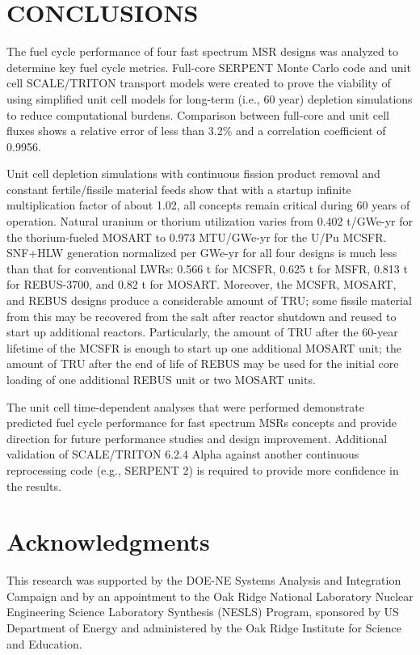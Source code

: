 \documentclass{anstrans}
\begin{document}
\section{CONCLUSIONS}
The fuel cycle performance of four fast spectrum \gls{MSR} designs was analyzed to determine key fuel cycle metrics. Full-core SERPENT Monte Carlo code and unit cell SCALE/TRITON transport models were created to prove the viability of using simplified unit cell models for long-term (i.e., 60 year) depletion simulations to reduce computational burdens. Comparison between full-core and unit cell fluxes shows a relative error of less than 3.2\% and a correlation coefficient of 0.9956.

Unit cell depletion simulations with continuous fission product removal and constant fertile/fissile material feeds show that with a startup infinite multiplication factor of about 1.02, all concepts remain critical during 60 years of operation. Natural uranium or thorium utilization varies from 0.402 t/GWe-yr for the thorium-fueled \gls{MOSART} to 0.973 MTU/GWe-yr for the U/Pu \gls{MCSFR}. \gls{SNF}+\gls{HLW} generation normalized per GWe-yr for all four designs is much less than that for conventional \glspl{LWR}: 0.566 t for \gls{MCSFR}, 0.625 t for \gls{MSFR}, 0.813 t for REBUS-3700, and 0.82 t for \gls{MOSART}. Moreover, the \gls{MCSFR}, \gls{MOSART}, and REBUS designs produce a considerable amount of \gls{TRU}; some fissile material from this may be recovered from the salt after reactor shutdown and reused to start up additional reactors. Particularly, the amount of \gls{TRU} after the 60-year lifetime of the \gls{MCSFR} is enough to start up one additional \gls{MOSART} unit; the amount of \gls{TRU} after the end of life of REBUS may be used for the initial core loading of one additional REBUS unit or two \gls{MOSART} units. 

The unit cell time-dependent analyses that were performed demonstrate predicted fuel cycle performance for fast spectrum \glspl{MSR} concepts and provide direction for future performance studies and design improvement. Additional validation of SCALE/TRITON 6.2.4 Alpha against another continuous reprocessing code (e.g., SERPENT 2) is required to provide more confidence in the results.

\section{Acknowledgments}
This research was supported by the DOE-NE Systems Analysis and Integration Campaign and by an appointment to the Oak Ridge National Laboratory Nuclear Engineering Science Laboratory Synthesis (NESLS) Program, sponsored by US Department of Energy and administered by the Oak Ridge Institute for Science and Education.



\end{document}
